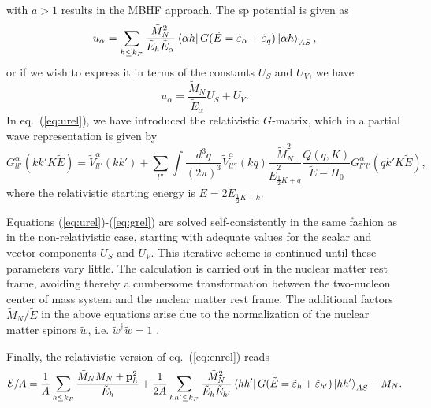 with $a>1$ results in the MBHF approach.
The sp potential is given as
\begin{equation}
   u_{\alpha} =\sum_{h\leq k_F} \frac{\tilde{M}_N^2}{\tilde{E}_h
	       \tilde{E}_{\alpha}}
	\left\langle \alpha h \right|G(\tilde{E}=\tilde{\varepsilon}_{\alpha}
	+\tilde{\varepsilon}_q)\left| \alpha h \right\rangle_{AS},
	\label{eq:urel}
\end{equation}
or if we wish to express it in terms of the constants $U_S$ and
$U_V$,
we have
\begin{equation}
   u_{\alpha} = \frac{\tilde{M}_N}{\tilde{E}_{\alpha}}U_S +U_V.
   \label{eq:sppotrel}
\end{equation}
In eq.\ (\ref{eq:urel}), we have introduced the relativistic $G$-matrix,
which in a partial wave representation is given by
\begin{equation}
   G_{ll'}^{\alpha}(kk'K\tilde{E})=\tilde{V}_{ll'}^{\alpha}(kk')
   +\sum_{l''}\int \frac{d^3 q}{(2\pi )^3}\tilde{V}_{ll''}^{\alpha}(kq)
   \frac{\tilde{M}_N^2}{\tilde{E}_{\frac{1}{2}K+q}^2}
   \frac{Q(q,K)}{\tilde{E}-H_0}
   G_{l''l'}^{\alpha}(qk'K\tilde{E}),
   \label{eq:grel}
\end{equation}
where the relativistic starting energy is
$\tilde{E}=2\tilde{E}_{\frac{1}{2}K+k}$.


Equations (\ref{eq:urel})-(\ref{eq:grel}) are solved self-consistently
in the same fashion as in the non-relativistic case, starting
with adequate values for the scalar and vector components
$U_S$ and $U_V$. This iterative scheme is continued until these
parameters vary little. The calculation is carried out in the
nuclear matter rest frame, avoiding thereby a cumbersome
transformation between the two-nucleon center of mass system
and the nuclear matter rest frame. The additional factors
$\tilde{M}_N/\tilde{E}$ in the above equations
arise due to the normalization of the
nuclear matter spinors $\tilde{w}$, i.e.
$\tilde{w}^{\dagger}\tilde{w}=1$ \cite{bm90}.


Finally, the relativistic version of eq.\ (\ref{eq:enrel}) reads
\begin{equation}
   {\cal E}/A =
   \frac{1}{A}\sum_{h\leq k_F}
   \frac{\tilde{M}_N M_N+{\bf p}_h^2}{\tilde{E}_h}+
   \frac{1}{2A}\sum_{hh' \leq k_F}\frac{\tilde{M}_N^2}{\tilde{E}_h\tilde{E}_{h'}}
   \left\langle hh' \right|G(\tilde{E}=
   \tilde{\varepsilon}_h +\tilde{\varepsilon}_{h'})\left| hh' \right\rangle_{AS} -M_N.
   \label{eq:erel}
\end{equation}

